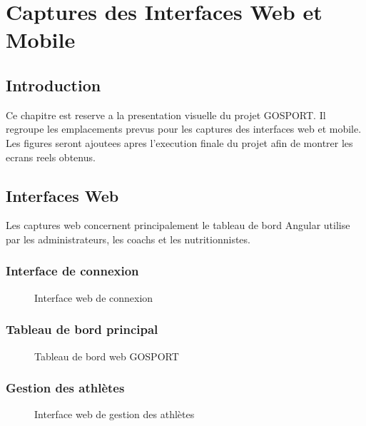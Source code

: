 \chapter{Captures des Interfaces Web et Mobile}
\minitoc
\newpage

\section{Introduction}
Ce chapitre est reserve a la presentation visuelle du projet GOSPORT. Il regroupe les emplacements prevus pour les captures des interfaces web et mobile. Les figures seront ajoutees apres l'execution finale du projet afin de montrer les ecrans reels obtenus.

\section{Interfaces Web}
Les captures web concernent principalement le tableau de bord Angular utilise par les administrateurs, les coachs et les nutritionnistes.

\subsection{Interface de connexion}
\begin{figure}[H]
\centering
{}
\caption{Interface web de connexion}
\end{figure}

\subsection{Tableau de bord principal}
\begin{figure}[H]
\centering
{}
\caption{Tableau de bord web GOSPORT}
\end{figure}

\subsection{Gestion des athlètes}
\begin{figure}[H]
\centering
{}
\caption{Interface web de gestion des athlètes}
\end{figure}

